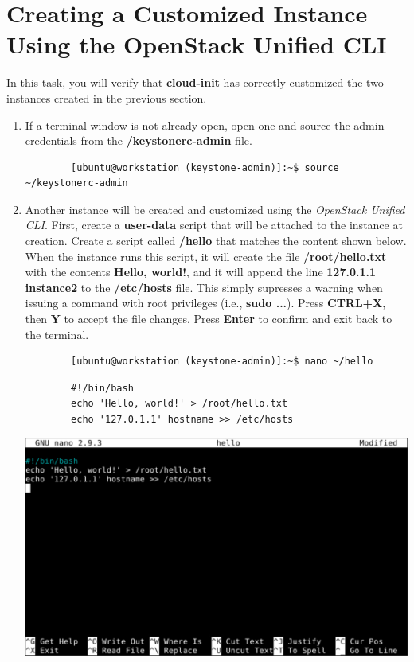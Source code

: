 \documentclass[letterpaper, 12pt]{article}
\begin{document}
\section{Creating a Customized Instance Using the OpenStack Unified CLI}
\label{sec:creating_a_customized_instance_using_the_openstack_unified_cli}
In this task, you will verify that \textbf{cloud-init} has correctly customized the two instances created in the
previous section.

\begin{enumerate}
    \item If a terminal window is not already open, open one and source the admin credentials from the 
    \textbf{\texttildemid/keystonerc-admin} file.
    \begin{lstlisting}
        [ubuntu@workstation (keystone-admin)]:~$ source ~/keystonerc-admin
    \end{lstlisting}

    \item Another instance will be created and customized using the \textit{OpenStack Unified CLI}. First, create a
    \textbf{user-data} script that will be attached to the instance at creation. Create a script called
    \textbf{\texttildemid/hello} that matches the content shown below. When the instance runs this script, it will
    create the file \textbf{/root/hello.txt} with the contents \textbf{Hello, world!}, and it will append the line
    \textbf{127.0.1.1 instance2} to the \textbf{/etc/hosts} file. This simply supresses a warning when issuing a
    command with root privileges (i.e., \textbf{sudo ...}). Press \textbf{CTRL+X}, then \textbf{Y} to accept the file
    changes. Press \textbf{Enter} to confirm and exit back to the terminal.
    \begin{lstlisting}
        [ubuntu@workstation (keystone-admin)]:~$ nano ~/hello
    \end{lstlisting}
    \begin{lstlisting}
        #!/bin/bash
        echo 'Hello, world!' > /root/hello.txt
        echo '127.0.1.1' hostname >> /etc/hosts
    \end{lstlisting}

    \begin{center}
        \includegraphics[width=\linewidth]{images/part3/step2.png}
    \end{center}


\end{enumerate}
\end{document}
